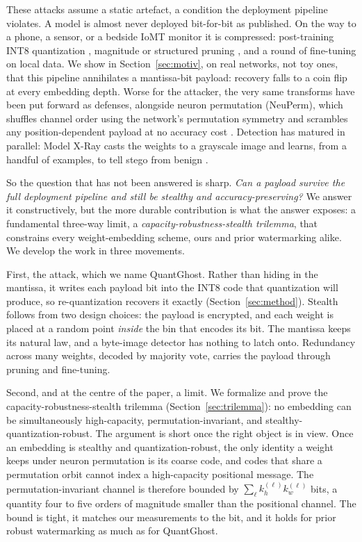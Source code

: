 \documentclass[a4paper,fleqn]{cas-dc}
\theoremstyle{plain}
\theoremstyle{remark}
\newcommand{\sys}{\mbox{QuantGhost}}
\begin{document}
These attacks assume a static artefact, a condition the deployment pipeline violates. A
model is almost never deployed bit-for-bit as published. On the way to a phone, a sensor, or a bedside IoMT
monitor it is compressed: post-training INT8 quantization \citep{jacob2018quantization},
magnitude or structured pruning \citep{han2015learning,han2016deepcompression}, and a
round of fine-tuning on local data. We show in Section~\ref{sec:motiv}, on real
networks, not toy ones, that this pipeline annihilates a mantissa-bit payload:
recovery falls to a coin flip at every embedding depth. Worse for the attacker, the
very same transforms have been put forward as defenses, alongside neuron permutation
(NeuPerm), which shuffles channel order using the network's permutation symmetry and
scrambles any position-dependent payload at no accuracy cost
\citep{gilkarov2025neuperm}. Detection has matured in parallel: Model X-Ray casts the
weights to a grayscale image and learns, from a handful of examples, to tell stego
from benign \citep{gilkarov2026modelxray}.

So the question that has not been answered is sharp. \emph{Can a payload survive the
full deployment pipeline and still be stealthy and accuracy-preserving?} We answer it
constructively, but the more durable contribution is what the answer exposes: a
fundamental three-way limit, a \emph{capacity-robustness-stealth trilemma}, that
constrains every weight-embedding scheme, ours and prior watermarking alike. We develop
the work in three movements.

First, the attack, which we name \sys. Rather than hiding in the mantissa, it writes
each payload bit into the INT8 code that quantization will produce, so re-quantization
recovers it exactly (Section~\ref{sec:method}). Stealth follows from two design choices:
the payload is encrypted, and each weight is placed at a random point \emph{inside} the
bin that encodes its bit. The mantissa keeps its natural law, and a byte-image detector has nothing to
latch onto. Redundancy across many weights, decoded by majority vote, carries the
payload through pruning and fine-tuning.

Second, and at the centre of the paper, a limit. We formalize and prove the
capacity-robustness-stealth trilemma (Section~\ref{sec:trilemma}): no embedding can be
simultaneously high-capacity, permutation-invariant, and stealthy-quantization-robust.
The argument is short once the right object is in view. Once an embedding is stealthy
and quantization-robust, the only identity a weight keeps under neuron permutation is
its coarse code, and codes that share a permutation orbit cannot index a high-capacity
positional message. The permutation-invariant channel is therefore bounded by
$\sum_\ell k_h^{(\ell)} k_w^{(\ell)}$ bits, a quantity four to five orders of magnitude
smaller than the positional channel. The bound is tight, it matches our measurements to
the bit, and it holds for prior robust watermarking as much as for \sys.
\end{document}
